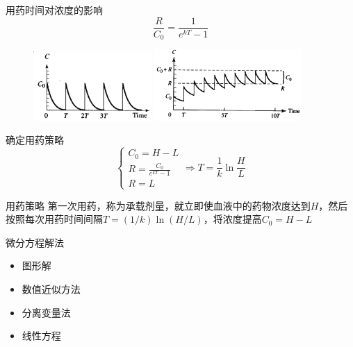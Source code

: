\documentclass[UTF8]{ctexbeamer}
\begin{document}
\begin{frame}{用药时间对浓度的影响}
  \[
  \frac{R}{C_0} = \frac{1}{e^{kT}-1}
  \]

  \begin{figure}
    \includegraphics[width=0.4\textwidth]{lt.png}
    \includegraphics[width=0.5\textwidth]{st.png}
  \end{figure}
  
\end{frame}

\begin{frame}{确定用药策略}
  \[
  \left\{
  \begin{array}{l}
    C_0 = H-L\\
    R = \frac{C_0}{e^{kT}-1}\\
    R=L
  \end{array}
\right. \Rightarrow T = \frac{1}{k}\ln\frac{H}{L}
  \]

  \begin{block}{用药策略}
    第一次用药，称为承载剂量，就立即使血液中的药物浓度达到$H$，然后按照每次用药时间间隔$T=(1/k)\ln(H/L)$，将浓度提高$C_0=H-L$
  \end{block}
  
\end{frame}

\begin{frame}{微分方程解法}
  \begin{itemize}
  \item 图形解
  \item 数值近似方法
  \item 分离变量法
  \item 线性方程
  \end{itemize}
\end{frame}
\end{document}
